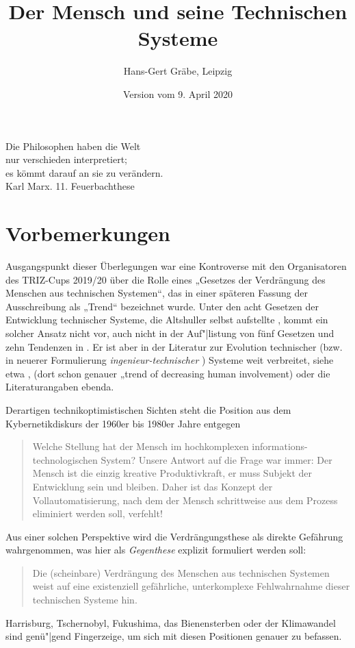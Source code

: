 \documentclass[11pt,a4paper]{article}
\title{Der Mensch und seine Technischen Systeme}
\author{Hans-Gert Gräbe, Leipzig}
\date{Version vom 9. April 2020}
\begin{document}
\maketitle

\begin{flushright}
  Die Philosophen haben die Welt\\ nur verschieden interpretiert;\\ es kömmt
  darauf an sie zu verändern.\\ Karl Marx. 11. Feuerbachthese
\end{flushright}
\section{Vorbemerkungen}

Ausgangspunkt dieser Überlegungen war eine Kontroverse mit den Organisatoren
des TRIZ-Cups 2019/20 über die Rolle eines „Gesetzes der Verdrängung des
Menschen aus technischen Systemen“, das in einer späteren Fassung der
Ausschreibung als „Trend“ bezeichnet wurde. Unter den acht Gesetzen der
Entwicklung technischer Systeme, die Altshuller selbst aufstellte
\cite[S. 122--127]{Altshuller1979}, kommt ein solcher Ansatz nicht vor, auch
nicht in der Auf"|listung von fünf Gesetzen und zehn Tendenzen in
\cite[S. 148\,ff.]{KoltzeSouchkov2017}.  Er ist aber in der Literatur zur
Evolution technischer (bzw. in neuerer Formulierung
\emph{ingenieur-technischer} \cite{TESE2018}) Systeme weit verbreitet, siehe
etwa \cite[2.24]{Goldovsky1983}, \cite[4.8]{TESE2018} (dort schon genauer
„trend of decreasing human involvement) oder die Literaturangaben ebenda.

Derartigen technikoptimistischen Sichten steht die Position aus dem
Kybernetikdiskurs der 1960er bis 1980er Jahre entgegen \cite[S. 10]{KFK2000}
\begin{quote}
  Welche Stellung hat der Mensch im hochkomplexen informations-technologischen
  System? Unsere Antwort auf die Frage war immer: Der Mensch ist die einzig
  kreative Produktivkraft, er muss Subjekt der Entwicklung sein und bleiben.
  Daher ist das Konzept der Vollautomatisierung, nach dem der Mensch
  schrittweise aus dem Prozess eliminiert werden soll, verfehlt!
\end{quote}
Aus einer solchen Perspektive wird die Verdrängungsthese als direkte Gefährung
wahrgenommen, was hier als \emph{Gegenthese} explizit formuliert werden soll:
\begin{quote}
  Die (scheinbare) Verdrängung des Menschen aus technischen Systemen weist auf
  eine existenziell gefährliche, unterkomplexe Fehlwahrnahme dieser
  technischen Systeme hin.
\end{quote}
Harrisburg, Tschernobyl, Fukushima, das Bienensterben \cite{Jacobasch2019}
oder der Klimawandel sind genü"|gend Fingerzeige, um sich mit diesen
Positionen genauer zu befassen.
\end{document}
